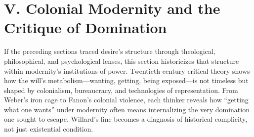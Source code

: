 \section*{V. Colonial Modernity and the Critique of Domination}
\label{sec:v-colonial-modernity}

If the preceding sections traced desire's structure through theological, philosophical, and 
psychological lenses, this section historicizes that structure within modernity's institutions 
of power. Twentieth-century critical theory shows how the will's metabolism---wanting, getting, 
being exposed---is not timeless but shaped by colonialism, bureaucracy, and technologies of 
representation. From Weber's iron cage to Fanon's colonial violence, each thinker reveals how 
``getting what one wants'' under modernity often means internalizing the very domination one 
sought to escape. Willard's line becomes a diagnosis of historical complicity, not just 
existential condition.


\pagebreak[2]

\pagebreak[2]

\pagebreak[2]

\pagebreak[2]

\pagebreak[2]


